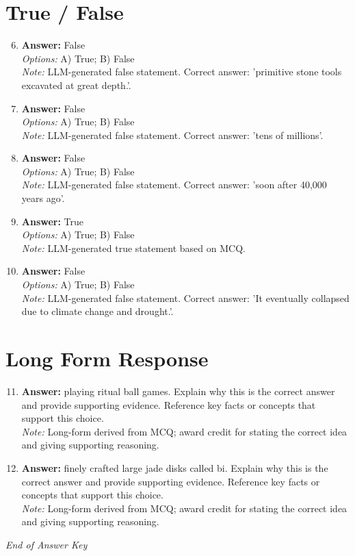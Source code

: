 \documentclass[12pt]{article}
\begin{document}
\section*{True / False}
\begin{enumerate}[label=\arabic*.]
\setcounter{enumi}{5}
\item \textbf{Answer:} False
\\ \textit{Options:} A) True; B) False
\\ \textit{Note:} LLM-generated false statement. Correct answer: 'primitive stone tools excavated at great depth.'.
\item \textbf{Answer:} False
\\ \textit{Options:} A) True; B) False
\\ \textit{Note:} LLM-generated false statement. Correct answer: 'tens of millions'.
\item \textbf{Answer:} False
\\ \textit{Options:} A) True; B) False
\\ \textit{Note:} LLM-generated false statement. Correct answer: 'soon after 40,000 years ago'.
\item \textbf{Answer:} True
\\ \textit{Options:} A) True; B) False
\\ \textit{Note:} LLM-generated true statement based on MCQ.
\item \textbf{Answer:} False
\\ \textit{Options:} A) True; B) False
\\ \textit{Note:} LLM-generated false statement. Correct answer: 'It eventually collapsed due to climate change and drought.'.
\end{enumerate}

\section*{Long Form Response}
\begin{enumerate}[label=\arabic*.]
\setcounter{enumi}{10}
\item \textbf{Answer:} playing ritual ball games. Explain why this is the correct answer and provide supporting evidence. Reference key facts or concepts that support this choice.
\\ \textit{Note:} Long-form derived from MCQ; award credit for stating the correct idea and giving supporting reasoning.
\item \textbf{Answer:} finely crafted large jade disks called bi. Explain why this is the correct answer and provide supporting evidence. Reference key facts or concepts that support this choice.
\\ \textit{Note:} Long-form derived from MCQ; award credit for stating the correct idea and giving supporting reasoning.
\end{enumerate}

\vfill
\noindent\textit{End of Answer Key}
\end{document}
